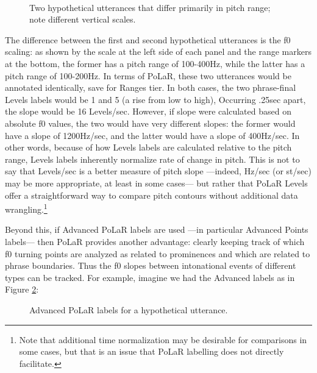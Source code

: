 \begin{figure}[H]
\centering
%
\begin{tikzpicture}[scale=.85, transform shape]\end{tikzpicture}~~\begin{tikzpicture}[scale=.85, transform shape]\end{tikzpicture}
%
\caption{Two hypothetical utterances that differ primarily in pitch range; note different vertical scales.%
\label{fig:Usages-slopes}%
}
\end{figure}

The difference between the first and second hypothetical utterances is the f0 scaling: as shown by the scale at the left side of each panel and the range markers at the bottom, the former has a pitch range of 100-400Hz, while the latter has a pitch range of 100-200Hz. In terms of PoLaR, these two utterances would be annotated identically, save for Ranges tier. In both cases, the two phrase-final Levels labels would be 1 and 5 (a rise from low to high), Occurring .25sec apart, the slope would be 16 Levels/sec. However, if slope were calculated based on absolute f0 values, the two would have very different slopes: the former would have a slope of 1200Hz/sec, and the latter would have a slope of 400Hz/sec. In other words, because of how Levels labels are calculated relative to the pitch range, Levels labels inherently normalize rate of change in pitch. This is not to say that Levels/sec is a better measure of pitch slope —indeed, Hz/sec (or st/sec) may be more appropriate, at least in some cases— but rather that PoLaR Levels offer a straightforward way to compare pitch contours without additional data wrangling.\footnote{Note that additional time normalization may be desirable for comparisons in some cases, but that is an issue that PoLaR labelling does not directly facilitate.}

Beyond this, if Advanced PoLaR labels are used —in particular Advanced Points labels— then PoLaR provides another advantage: clearly keeping track of which f0 turning points are analyzed as related to prominences and which are related to phrase boundaries. Thus the f0 slopes between intonational events of different types can be tracked. For example, imagine we had the Advanced labels as in Figure \ref{fig:Usages-slopes-advanced}:

\begin{figure}[H]
\centering
%
\begin{tikzpicture}[scale=1.25]\end{tikzpicture}
%
\caption{Advanced PoLaR labels for a hypothetical utterance.%
\label{fig:Usages-slopes-advanced}%
}
\end{figure}

